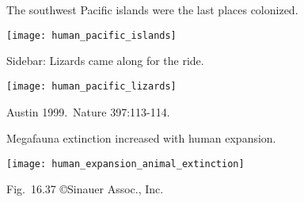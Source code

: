 \documentclass[t]{beamer}
\begin{document}
%
\begin{frame}{The southwest Pacific islands were the last places colonized.}
	\vspace{-\baselineskip}
	\begin{center}
		\texttt{[image: human\_pacific\_islands]}
	\end{center}
\end{frame}
%
\begin{frame}{Sidebar: Lizards came along for the ride.}
	\vspace{-\baselineskip}
	\begin{center}
		\texttt{[image: human\_pacific\_lizards]}
	\end{center}

	\hfill \tiny Austin 1999.~Nature 397:113-114.
\end{frame}
%
%
%	
%
\begin{frame}[t]{Megafauna extinction increased with human expansion.}
	\vspace{-\baselineskip}
	\begin{center}
		\texttt{[image: human\_expansion\_animal\_extinction]}
	\end{center}

	\vfilll
	
	\hfill \tiny Fig.~16.37 \copyright Sinauer Assoc., Inc.
	
\end{frame}
%
\end{document}
